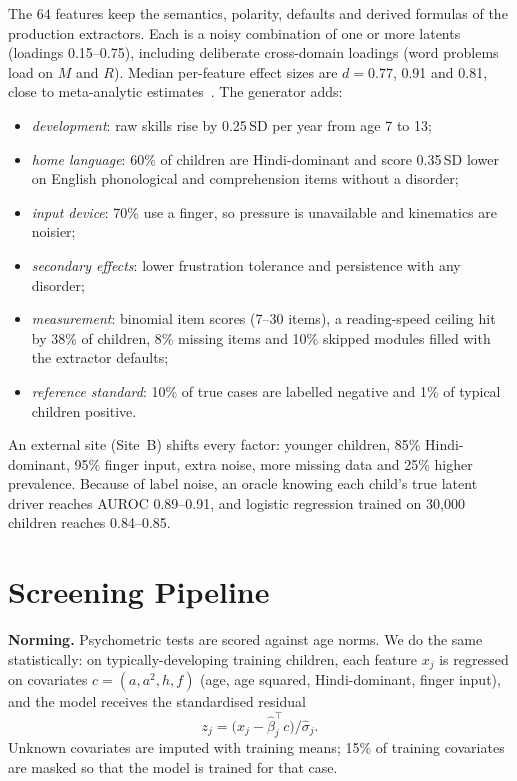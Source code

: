 \documentclass[conference]{IEEEtran}
\begin{document}
The 64 features keep the semantics, polarity, defaults and derived formulas of the
production extractors. Each is a noisy combination of one or more latents (loadings
0.15--0.75), including deliberate cross-domain loadings (word problems load on $M$
and $R$). Median per-feature effect sizes are $d{=}0.77$, 0.91 and 0.81, close to
meta-analytic estimates~\cite{melbylervag2012}. The generator adds:
\begin{itemize}
\item \emph{development}: raw skills rise by 0.25\,SD per year from age 7 to 13;
\item \emph{home language}: 60\% of children are Hindi-dominant and score 0.35\,SD
lower on English phonological and comprehension items without a disorder;
\item \emph{input device}: 70\% use a finger, so pressure is unavailable and
kinematics are noisier;
\item \emph{secondary effects}: lower frustration tolerance and persistence with any
disorder;
\item \emph{measurement}: binomial item scores (7--30 items), a reading-speed ceiling
hit by 38\% of children, 8\% missing items and 10\% skipped modules filled with the
extractor defaults;
\item \emph{reference standard}: 10\% of true cases are labelled negative and 1\% of
typical children positive.
\end{itemize}
An external site (Site~B) shifts every factor: younger children, 85\% Hindi-dominant,
95\% finger input, extra noise, more missing data and 25\% higher prevalence. Because
of label noise, an oracle knowing each child's true latent driver reaches AUROC
0.89--0.91, and logistic regression trained on 30{,}000 children reaches 0.84--0.85.

\section{Screening Pipeline}\label{sec:pipeline}
\textbf{Norming.} Psychometric tests are scored against age norms. We do the same
statistically: on typically-developing training children, each feature $x_j$ is
regressed on covariates $c=(a,a^2,h,f)$ (age, age squared, Hindi-dominant, finger
input), and the model receives the standardised residual
\begin{equation}
z_j = \bigl(x_j - \hat\beta_j^{\top} c\bigr)/\hat\sigma_j .
\end{equation}
Unknown covariates are imputed with training means; 15\% of training covariates are
masked so that the model is trained for that case.
\end{document}
